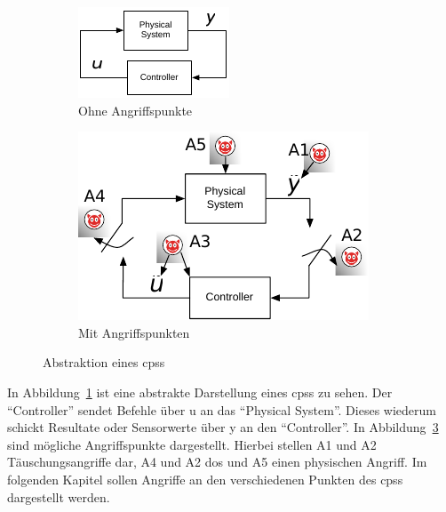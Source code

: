 \documentclass[final,bibliography=totocnumbered]{include/sikseminar}
\newcommand{\cps}{\glspl{cps}\xspace}
\begin{document}
\begin{figure}
    \centering
    \begin{subfigure}[b]{0.3\textwidth}
        \includegraphics[width=\textwidth]{abstrakt}
        \caption{Ohne Angriffspunkte}
        \label{fig:abstrakt}
    \end{subfigure}
    \qquad
    \begin{subfigure}[b]{0.4\textwidth}
        \includegraphics[width=\textwidth]{attack_points}
        \caption{Mit Angriffspunkten}
        \label{fig:attack_points}
    \end{subfigure}
    \caption{Abstraktion eines \cps~\cite{CAS08}}
\end{figure}

In Abbildung~\ref{fig:abstrakt} ist eine abstrakte Darstellung eines \cps zu sehen.
Der \enquote{Controller} sendet Befehle über u an das \enquote{Physical System}.
Dieses wiederum schickt Resultate oder Sensorwerte über y an den \enquote{Controller}.
In Abbildung~\ref{fig:attack_points} sind mögliche Angriffspunkte dargestellt.
Hierbei stellen A1 und A2 Täuschungsangriffe dar, A4 und A2 \gls{dos} und A5 einen physischen Angriff.
Im folgenden Kapitel sollen Angriffe an den verschiedenen Punkten des \cps dargestellt werden.
\end{document}
